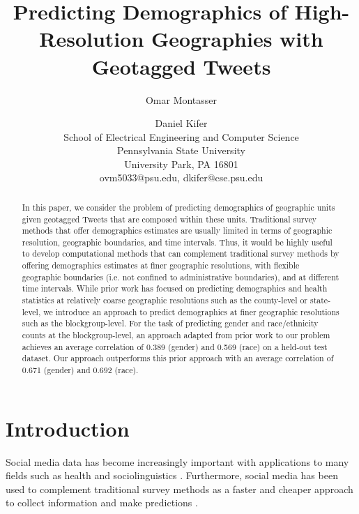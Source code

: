 \documentclass[letterpaper]{article}
\begin{document}
\title{Predicting Demographics of High-Resolution Geographies with Geotagged Tweets}
\author{Omar Montasser \and Daniel Kifer\\
School of Electrical Engineering and Computer Science\\
Pennsylvania State University \\
University Park, PA 16801\\
ovm5033@psu.edu, dkifer@cse.psu.edu
}
\maketitle
\begin{abstract}

In this paper, we consider the problem of predicting demographics of geographic units given geotagged Tweets that are composed within these units. Traditional survey methods that offer demographics estimates are usually limited in terms of geographic resolution, geographic boundaries, and time intervals. Thus, it would be highly useful to develop computational methods that can complement traditional survey methods by offering demographics estimates at finer geographic resolutions, with flexible geographic boundaries (i.e. not confined to administrative boundaries), and at different time intervals. While prior work has focused on predicting demographics and health statistics at relatively coarse geographic resolutions such as the county-level or state-level, we introduce an approach to predict demographics at finer geographic resolutions such as the blockgroup-level. For the task of predicting gender and race/ethnicity counts at the blockgroup-level, an approach adapted from prior work to our problem achieves an average correlation of 0.389 (gender) and 0.569 (race) on a held-out test dataset. Our approach outperforms this prior approach with an average correlation of 0.671 (gender) and 0.692 (race).

\end{abstract}

\section{Introduction}

\noindent Social media data has become increasingly important with applications to many fields such as health \cite{culotta2014estimating} and sociolinguistics \cite{eisenstein2014diffusion}. Furthermore, social media has been used to complement traditional survey methods as a faster and cheaper approach to collect information and make predictions \cite{benton2016collective}.
\end{document}
